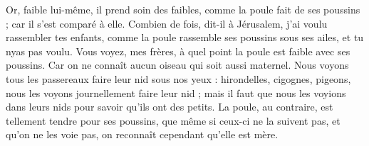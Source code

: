 Or, faible lui-même, il prend soin des faibles, comme la poule fait de ses poussins ; car il s’est comparé à elle. Combien de fois, dit-il à Jérusalem, j’ai voulu rassembler tes enfants, comme la poule rassemble ses poussins sous ses ailes, et tu nyas pas voulu. Vous voyez, mes frères, à quel point la poule est faible avec ses poussins. Car on ne connaît aucun oiseau qui soit aussi maternel. Nous voyons tous les passereaux faire leur nid sous nos yeux : hirondelles, cigognes, pigeons, nous les voyons journellement faire leur nid ; mais il faut que nous les voyions dans leurs nids pour savoir qu’ils ont des petits. La poule, au contraire, est tellement tendre pour ses poussins, que même si ceux-ci ne la suivent pas, et qu’on ne les voie pas, on reconnaît cependant qu’elle est mère.
